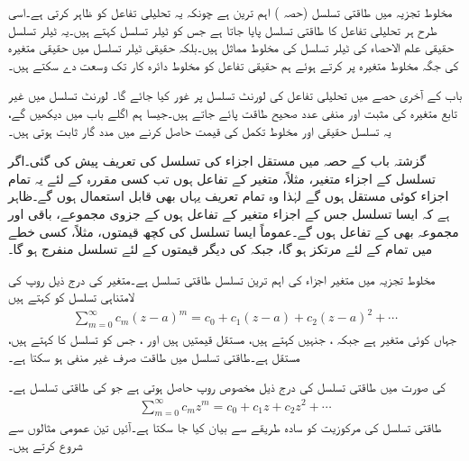 مخلوط تجزیہ میں طاقتی تسلسل (حصہ )  اہم ترین ہے چونکہ یہ تحلیلی تفاعل کو ظاہر کرتی ہے۔اسی طرح ہر تحلیلی تفاعل کا طاقتی تسلسل پایا جاتا ہے جس کو ٹیلر تسلسل کہتے ہیں۔یہ  ٹیلر تسلسل حقیقی علم الاحصاء کی ٹیلر تسلسل کی مخلوط مماثل ہیں۔بلکہ حقیقی ٹیلر تسلسل میں حقیقی متغیرہ کی جگہ مخلوط متغیرہ پر کرتے ہوئے ہم حقیقی تفاعل کو مخلوط دائرہ کار تک وسعت دے سکتے ہیں۔

باب کے آخری حصے میں تحلیلی تفاعل کی لورنٹ تسلسل پر غور کیا جائے گا۔ لورنٹ تسلسل میں غیر تابع متغیرہ کی مثبت اور منفی عدد صحیح طاقت پائے جاتے ہیں۔جیسا ہم اگلے باب میں دیکھیں گے، یہ تسلسل حقیقی اور مخلوط تکمل کی قیمت حاصل کرنے میں مدد گار ثابت ہوتی ہیں۔

گزشتہ باب کے حصہ  میں مستقل اجزاء کی تسلسل کی تعریف پیش کی گئی۔اگر تسلسل کے اجزاء متغیر، مثلاً، متغیر  کے تفاعل  ہوں تب کسی مقررہ  کے لئے یہ تمام اجزاء کوئی مستقل ہوں گے لہٰذا وہ تمام تعریف یہاں بھی قابل استعمال ہوں گے۔ظاہر ہے کہ ایسا تسلسل جس کے اجزاء متغیر  کے تفاعل ہوں کے جزوی مجموعے، باقی اور مجموعہ بھی  کے تفاعل ہوں گے۔عموماً ایسا تسلسل  کی کچھ قیمتوں، مثلاً، کسی خطے میں تمام   کے لئے مرتکز ہو گا، جبکہ  کی دیگر قیمتوں کے لئے تسلسل منفرج ہو گا۔ 

مخلوط تجزیہ میں متغیر اجزاء کی اہم ترین تسلسل طاقتی تسلسل ہے۔متغیر   کی   درج ذیل روپ کی لامتناہی تسلسل کو کہتے ہیں
\begin{align}\label{مساوات_ٹیلر_طاقتی_تسلسل_الف}
\sum\limits_{m=0}^{\infty} c_m(z-a)^m=c_0+c_1(z-a)+c_2(z-a)^2+\cdots
\end{align}
 جہاں  کوئی متغیر ہے جبکہ ، جنہیں  کہتے ہیں، مستقل قیمتیں ہیں اور ، جس کو تسلسل کا  کہتے ہیں، مستقل ہے۔طاقتی تسلسل  میں طاقت  صرف غیر منفی ہو سکتا ہے۔

 کی صورت میں طاقتی تسلسل کی درج ذیل مخصوص روپ حاصل ہوتی ہے جو  کی طاقتی تسلسل ہے۔
\begin{align}\label{مساوات_ٹیلر_طاقتی_تسلسل_ب}
\sum\limits_{m=0}^{\infty} c_mz^m=c_0+c_1z+c_2z^2+\cdots
\end{align}
 طاقتی تسلسل کی مرکوزیت کو سادہ طریقے سے بیان کیا جا سکتا ہے۔آئیں تین عمومی مثالوں سے شروع کرتے ہیں۔

